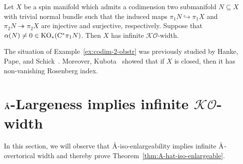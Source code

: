 \documentclass[pdftex]{sigma}
\numberwithin{equation}{section}
\begin{document}
\begin{Example}\label{ex:codim-2-obstr}
 Let \(X\) be a spin manifold which admits a codimension two submanifold \(N \subseteq X\) with trivial normal bundle such that the induced maps \(\pi_1 N \hookrightarrow \pi_1 X\) and \(\pi_2 N \twoheadrightarrow \pi_2 X\) are injective and surjective, respectively.
 Suppose that \(\alpha(N) \neq 0 \in \operatorname{KO}_\ast(\mathrm{C}^\ast \pi_1 N)\).
 Then \(X\) has infinite \(\mathcal{KO}\)-width.
\end{Example}

The situation of Example~\ref{ex:codim-2-obstr} was previously studied by Hanke, Pape, and Schick~\cite{HankePapeSchick:CodimensionTwoIndex}.
Moreover, Kubota~\cite{kubotaRelativeMishchenkoFomenko2019,KubotaSchick:Codim2} showed that if \(X\) is closed, then it has non-vanishing Rosenberg index.

\section[Ahat-Largeness implies infinite KO-width]{\(\boldsymbol{\hat{\mathrm{A}}}\)-Largeness implies infinite \(\boldsymbol{\mathcal{KO}}\)-width} \label{A-hat-largeness}

In this section, we will observe that \(\hat{\mathrm{A}}\)-iso-enlargeability implies infinite \(\hat{\mathrm{A}}\)-overtorical width and thereby prove Theorem~\ref{thm:A-hat-iso-enlargeable}.
\end{document}
